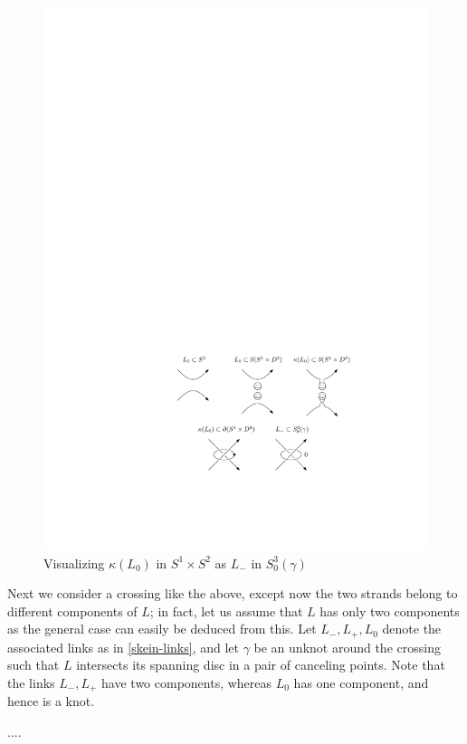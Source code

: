 \begin{figure}[tb]
\centering
\includegraphics[scale=1]{graphics/visualizing-L0}
\caption{Visualizing $\kappa(L_0)$ in $S^1 \times S^2$ as $L_-$ in $S_0^3(\gamma)$}
\label{visualizing-L0}
\end{figure}

Next we consider a crossing like the above, except now the two strands belong to different components of $L$; in fact, let us assume that $L$ has only two components as the general case can easily be deduced from this. Let $L_-,L_+,L_0$ denote the associated links as in \cref{skein-links}, and let $\gamma$ be an unknot around the crossing such that $L$ intersects its spanning disc in a pair of canceling points. Note that the links $L_-,L_+$ have two components, whereas $L_0$ has one component, and hence is a knot. 


.... \unfinished




